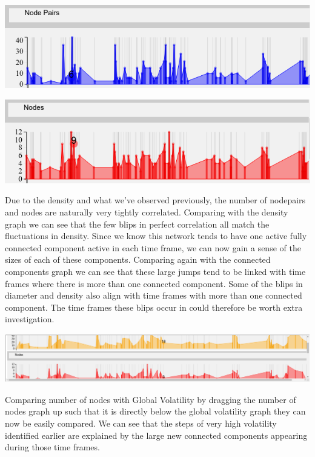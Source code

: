 \begin{center}
\includegraphics[trim={0 0 0 0}, width=140mm]{./Figures/TurinNodePairs.png}
\end{center}    
\begin{center}
\includegraphics[trim={0 0 0 0}, width=140mm]{./Figures/TurinNodes.png}
\end{center}    
Due to the density and what we've observed previously, the number of nodepairs and nodes are naturally very tightly correlated. Comparing with the density graph we can see that the few blips in perfect correlation all match the fluctuations in density. Since we know this network tends to have one active fully connected component active in each time frame, we can now gain a sense of the sizes of each of these components. Comparing again with the connected components graph we can see that these large jumps tend to be linked with time frames where there is more than one connected component. Some of the blips in diameter and density also align with time frames with more than one connected component. The time frames these blips occur in could therefore be worth extra investigation.
    
\begin{center}
\includegraphics[trim={0 0 0 0}, width=140mm]{./Figures/TurinGlobalVolatilityAndNodes.png}
\end{center}        

Comparing number of nodes with Global Volatility by dragging the number of nodes graph up such that it is directly below the global volatility graph they can now be easily compared. We can see that the steps of very high volatility identified earlier are explained by the large new connected components appearing during those time frames.
   
